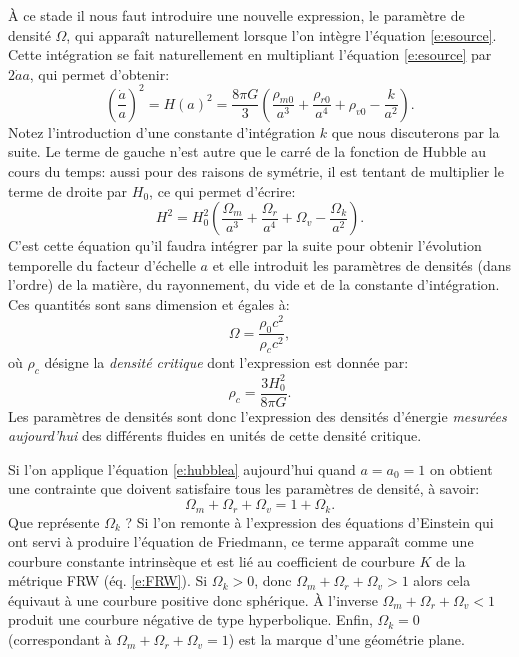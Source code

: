 À ce stade il nous faut introduire une nouvelle expression, le paramètre de densité $\Omega$, qui apparaît naturellement lorsque l'on intègre l'équation \ref{e:esource}. Cette intégration se fait naturellement en multipliant l'équation \ref{e:esource} par $2\dot a a$, qui permet d'obtenir:
\begin{equation}
\left(\frac{\dot a}{a}\right)^2=H(a)^2=\frac{8\pi G}{3}(\frac{\rho_{m0}}{a^3}+\frac{\rho_{r0}}{a^4}+\rho_{v0}-\frac{k}{a^2}).
\end{equation}
Notez l'introduction d'une constante d'intégration $k$ que nous discuterons par la suite. Le terme de gauche n'est autre que le carré de la fonction de Hubble au cours du temps: aussi pour des raisons de symétrie, il est tentant de multiplier le terme de droite par $H_0$, ce qui permet d'écrire:
\begin{equation}
H^2=H_0^2(\frac{\Omega_m}{a^3}+\frac{\Omega_r}{a^4}+\Omega_v-\frac{\Omega_k}{a^2}).
\label{e:hubblea}
\end{equation}
C'est cette équation qu'il faudra intégrer par la suite pour obtenir l'évolution temporelle du facteur d'échelle $a$ et elle introduit les paramètres de densités (dans l'ordre) de la matière, du rayonnement, du vide et de la constante d'intégration. Ces quantités sont sans dimension et égales à:
\begin{equation}
\Omega=\frac{\rho_0 c^2}{\rho_c c^2},
\end{equation}
où $\rho_c$ désigne la \textit{densité critique} dont l'expression est donnée par:
\begin{equation}
\rho_c=\frac{3H_0^2}{8\pi G}.
\end{equation}
Les paramètres de densités sont donc l'expression des densités d'énergie \textit{mesurées aujourd'hui} des différents fluides en unités de cette densité critique.

Si l'on applique l'équation \ref{e:hubblea} aujourd'hui quand $a=a_0=1$ on obtient une contrainte que doivent satisfaire tous les paramètres de densité, à savoir:
\begin{equation}
\Omega_m+\Omega_r+\Omega_v= 1+\Omega_k.
\end{equation}
Que représente $\Omega_k$ ? Si l'on remonte à l'expression des équations d'Einstein qui ont servi à produire l'équation de Friedmann, ce terme apparaît comme une courbure constante intrinsèque et est lié au coefficient de courbure $K$ de la métrique FRW (éq. \ref{e:FRW}). Si $\Omega_k>0$, donc $\Omega_m+\Omega_r+\Omega_v>1$ alors cela équivaut à une courbure positive donc sphérique. À l'inverse $\Omega_m+\Omega_r+\Omega_v<1$ produit une courbure négative de type hyperbolique. Enfin, $\Omega_k=0$  (correspondant à $\Omega_m+\Omega_r+\Omega_v=1$) est la marque d'une géométrie plane. 


